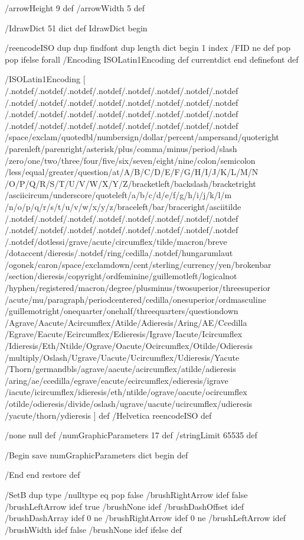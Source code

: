 /arrowHeight 9 def
/arrowWidth 5 def

/IdrawDict 51 dict def
IdrawDict begin

/reencodeISO {
dup dup findfont dup length dict begin
{ 1 index /FID ne { def }{ pop pop } ifelse } forall
/Encoding ISOLatin1Encoding def
currentdict end definefont
} def

/ISOLatin1Encoding [
/.notdef/.notdef/.notdef/.notdef/.notdef/.notdef/.notdef/.notdef
/.notdef/.notdef/.notdef/.notdef/.notdef/.notdef/.notdef/.notdef
/.notdef/.notdef/.notdef/.notdef/.notdef/.notdef/.notdef/.notdef
/.notdef/.notdef/.notdef/.notdef/.notdef/.notdef/.notdef/.notdef
/space/exclam/quotedbl/numbersign/dollar/percent/ampersand/quoteright
/parenleft/parenright/asterisk/plus/comma/minus/period/slash
/zero/one/two/three/four/five/six/seven/eight/nine/colon/semicolon
/less/equal/greater/question/at/A/B/C/D/E/F/G/H/I/J/K/L/M/N
/O/P/Q/R/S/T/U/V/W/X/Y/Z/bracketleft/backslash/bracketright
/asciicircum/underscore/quoteleft/a/b/c/d/e/f/g/h/i/j/k/l/m
/n/o/p/q/r/s/t/u/v/w/x/y/z/braceleft/bar/braceright/asciitilde
/.notdef/.notdef/.notdef/.notdef/.notdef/.notdef/.notdef/.notdef
/.notdef/.notdef/.notdef/.notdef/.notdef/.notdef/.notdef/.notdef
/.notdef/dotlessi/grave/acute/circumflex/tilde/macron/breve
/dotaccent/dieresis/.notdef/ring/cedilla/.notdef/hungarumlaut
/ogonek/caron/space/exclamdown/cent/sterling/currency/yen/brokenbar
/section/dieresis/copyright/ordfeminine/guillemotleft/logicalnot
/hyphen/registered/macron/degree/plusminus/twosuperior/threesuperior
/acute/mu/paragraph/periodcentered/cedilla/onesuperior/ordmasculine
/guillemotright/onequarter/onehalf/threequarters/questiondown
/Agrave/Aacute/Acircumflex/Atilde/Adieresis/Aring/AE/Ccedilla
/Egrave/Eacute/Ecircumflex/Edieresis/Igrave/Iacute/Icircumflex
/Idieresis/Eth/Ntilde/Ograve/Oacute/Ocircumflex/Otilde/Odieresis
/multiply/Oslash/Ugrave/Uacute/Ucircumflex/Udieresis/Yacute
/Thorn/germandbls/agrave/aacute/acircumflex/atilde/adieresis
/aring/ae/ccedilla/egrave/eacute/ecircumflex/edieresis/igrave
/iacute/icircumflex/idieresis/eth/ntilde/ograve/oacute/ocircumflex
/otilde/odieresis/divide/oslash/ugrave/uacute/ucircumflex/udieresis
/yacute/thorn/ydieresis
] def
/Helvetica reencodeISO def

/none null def
/numGraphicParameters 17 def
/stringLimit 65535 def

/Begin {
save
numGraphicParameters dict begin
} def

/End {
end
restore
} def

/SetB {
dup type /nulltype eq {
pop
false /brushRightArrow idef
false /brushLeftArrow idef
true /brushNone idef
} {
/brushDashOffset idef
/brushDashArray idef
0 ne /brushRightArrow idef
0 ne /brushLeftArrow idef
/brushWidth idef
false /brushNone idef
} ifelse
} def

